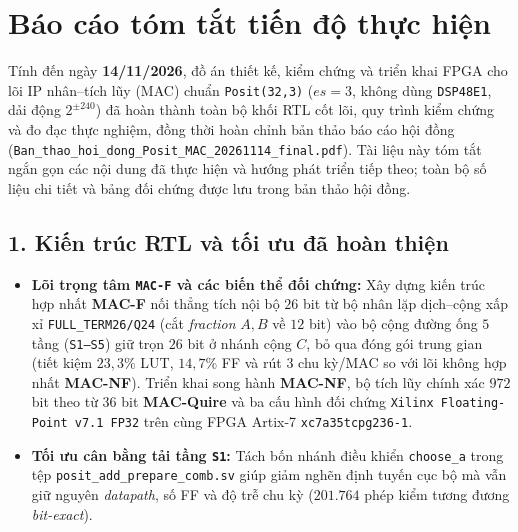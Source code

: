 

\hypersetup{pageanchor=false}

\hypersetup{pageanchor=true}

\chapter*{Báo cáo tóm tắt tiến độ thực hiện}

Tính đến ngày \textbf{14/11/2026}, đồ án thiết kế, kiểm chứng và triển khai FPGA
cho lõi IP nhân--tích lũy (MAC) chuẩn \texttt{Posit(32,3)} ($es=3$, không dùng
\texttt{DSP48E1}, dải động $2^{\pm 240}$) đã hoàn thành toàn bộ khối RTL cốt lõi,
quy trình kiểm chứng và đo đạc thực nghiệm, đồng thời hoàn chỉnh bản thảo báo
cáo hội đồng (\texttt{Ban\_thao\_hoi\_dong\_Posit\_MAC\_20261114\_final.pdf}).
Tài liệu này tóm tắt ngắn gọn các nội dung đã thực hiện và hướng phát triển tiếp
theo; toàn bộ số liệu chi tiết và bảng đối chứng được lưu trong bản thảo hội đồng.

\section*{1. Kiến trúc RTL và tối ưu đã hoàn thiện}
\begin{itemize}
  \item \textbf{Lõi trọng tâm \texttt{MAC-F} và các biến thể đối chứng:} Xây dựng
        kiến trúc hợp nhất \textbf{MAC-F} nối thẳng tích nội bộ $26$ bit từ bộ
        nhân lặp dịch--cộng xấp xỉ \texttt{FULL\_TERM26/Q24} (cắt \textit{fraction}
        $A, B$ về $12$ bit) vào bộ cộng đường ống $5$ tầng (\texttt{S1--S5}) giữ
        trọn $26$ bit ở nhánh cộng $C$, bỏ qua đóng gói trung gian (tiết kiệm
        $23{,}3\%$ LUT, $14{,}7\%$ FF và rút $3$ chu kỳ/MAC so với lõi không
        hợp nhất \textbf{MAC-NF}). Triển khai song hành \textbf{MAC-NF}, bộ tích
        lũy chính xác $972$ bit theo từ $36$ bit \textbf{MAC-Quire} và ba cấu
        hình đối chứng \texttt{Xilinx Floating-Point v7.1 FP32} trên cùng
        FPGA Artix-7 \texttt{xc7a35tcpg236-1}.
  \item \textbf{Tối ưu cân bằng tải tầng \texttt{S1}:} Tách bốn nhánh điều khiển
        \texttt{choose\_a} trong tệp \texttt{posit\_add\_\-prepare\_comb.sv} giúp giảm
        nghẽn định tuyến cục bộ mà vẫn giữ nguyên \textit{datapath}, số FF và
        độ trễ chu kỳ ($201.764$ phép kiểm tương đương \textit{bit-exact}).
\end{itemize}

